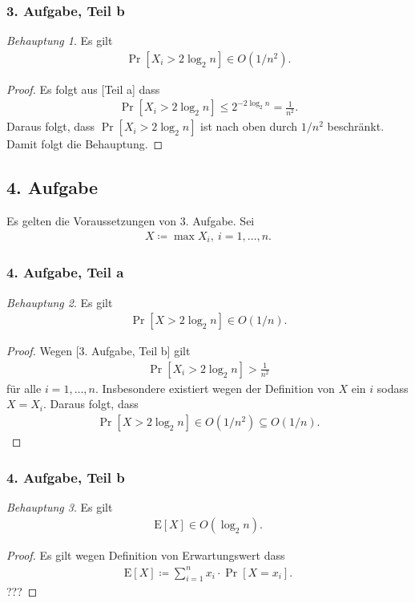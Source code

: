 \documentclass[draft,a5paper]{article}
\theoremstyle{remark}
\newtheorem*{Behauptung}{Behauptung}
\begin{document}
\subsubsection*{3. Aufgabe, Teil b}
\begin{Behauptung}
  Es gilt \begin{align*}\Pr[X_{i} > 2 \log_{2}{n}] \in O(1/n^{2}).\end{align*}
\end{Behauptung}
\begin{proof}
  Es folgt aus [Teil a] dass
  \begin{align*}\Pr[X_{i} > 2\log_{2}{n}] \le 2^{-2\log_{2}{n}} =
    \frac{1}{n^{2}}. \end{align*}
  Daraus folgt, dass \(\Pr[X_{i} > 2 \log_{2}{n}]\) ist nach oben
  durch \(1/n^{2}\) beschränkt.  Damit folgt die Behauptung.
\end{proof}
\subsection*{4. Aufgabe}
Es gelten die Voraussetzungen von 3. Aufgabe.  Sei
\begin{align*}X \coloneq \max{X_{i}},~ i = 1, \ldots, n.\end{align*}
\subsubsection*{4. Aufgabe, Teil a}
\begin{Behauptung}
Es gilt \begin{align*}\Pr[X > 2 \log_{2}{n}] \in O(1/n).\end{align*}
\end{Behauptung}
\begin{proof}
  Wegen [3. Aufgabe, Teil b] gilt
  \begin{align*}\Pr[X_{i} > 2\log_{2}{n}] > \frac{1}{n^{2}} \end{align*}
  für alle \(i = 1 , \ldots, n\). Insbesondere existiert wegen der
  Definition von \(X\) ein \(i\) sodass \(X = X_{i}\).  Daraus folgt,
  dass
  \begin{align*}\Pr[X > 2\log_{2}{n}] \in O(1/n^{2}) \subseteq O(1/n).\end{align*}
\end{proof}
\subsubsection*{4. Aufgabe, Teil b}
\begin{Behauptung}
  Es gilt
  \begin{align*}\mathrm{E}[X] \in O(\log_{2}{n}).\end{align*}
\end{Behauptung}
\begin{proof}
  Es gilt wegen Definition von Erwartungswert dass \begin{align*}\mathrm{E}[X]
    \coloneq \sum_{i=1}^{n}{x_{i} \cdot \Pr[X=x_{i}]}.\end{align*}
  ???
\end{proof}
\end{document}

